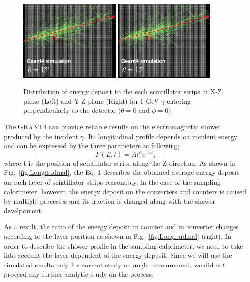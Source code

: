 \documentclass[jkps,preprint,fleqn,showpacs,showkeys]{revtex4}
\begin{document}
\begin{figure}[!hbt]
\includegraphics[width=0.45\textwidth]{figures/EventDisplay.jpg}
\includegraphics[width=0.45\textwidth]{figures/EventDisplay.jpg}
\caption{Distribution of energy deposit to the each scintillator strips in X-Z plane (Left) and Y-Z plane (Right) for 1-GeV $\gamma$ entering perpendicularly to the detector ($\theta=0$ and $\phi=0$).}
\label{fig:Evt_Dis}
\end{figure}

The GRANT4 can provide reliable results on the electromagnetic shower produced by the incident $\gamma$. Its longitudinal profile depends on incident energy and can be expressed \cite{Longo} by the three parameters as following;
\begin{equation}
    F(E,t)=A  t^\alpha e^{-bt},
\end{equation}
where t is the position of scintillator strips along the Z-direction. As shown in Fig.~\ref{fig:Longitudinal}, the Eq. 1 describes the obtained average energy deposit on each layer of scintillator strips reasonably. In the case of the sampling calorimeter, however, the energy deposit on the converters and counters is caused by multiple processes and its fraction is changed along with the shower develpoment.

As a result, the ratio of the energy deposit in counter and in converter changes according to the layer position as shown in Fig.~\ref{fig:Longitudinal} (right). In order to describe the shower profile in the sampling calorimeter, we need to take into account the layer dependent of the energy deposit. Since we will use the simulated results only for current study on angle measurement, we did not proceed any further analytic study on the process.
\end{document}
